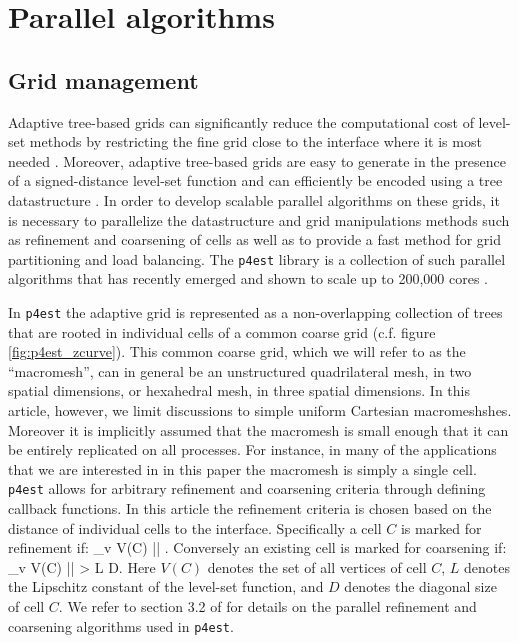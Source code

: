 \section{Parallel algorithms}\label{sec:parallel algorithms}
\subsection{Grid management}
Adaptive tree-based grids can significantly reduce the computational cost of level-set methods by restricting the fine grid close to the interface where it is most needed \cite{Strain:99:Tree-Methods-for-Mov}. Moreover, adaptive tree-based grids are easy to generate in the presence of a signed-distance level-set function \cite{Min;Gibou:07:A-second-order-accur} and can efficiently be encoded using a tree datastructure \cite{Samet:90:Applications-of-Spat}. In order to develop scalable parallel algorithms on these grids, it is necessary to parallelize the datastructure and grid manipulations methods such as refinement and coarsening of cells as well as to provide a fast method for grid partitioning and load balancing. The \texttt{p4est} library \cite{p4est-github} is a collection of such parallel algorithms that has recently emerged and shown to scale up to 200,000 cores \cite{Burstedde;Wilcox;Ghattas:11:p4est:-Scalable-Algo}.

In \texttt{p4est} the adaptive grid is represented as a non-overlapping collection of trees that are rooted in individual cells of a common coarse grid (c.f. figure \ref{fig:p4est_zcurve}). This common coarse grid, which we will refer to as the ``macromesh'', can in general be an unstructured quadrilateral mesh, in two spatial dimensions, or hexahedral mesh, in three spatial dimensions. In this article, however, we limit discussions to simple uniform Cartesian macromeshshes. Moreover it is implicitly assumed that the macromesh is small enough that it can be entirely replicated on all processes. For instance, in many of the applications that we are interested in in this paper the macromesh is simply a single cell. \texttt{p4est} allows for arbitrary refinement and coarsening criteria through defining callback functions. In this article the refinement criteria is chosen based on the distance of individual cells to the interface. Specifically a cell $C$ is marked for refinement if:
\be
\min_{\forall v \in V(C)} |\phi| \le {}.
\label{eq:refine}
\ee
Conversely an existing cell is marked for coarsening if:
\be
\min_{\forall v \in V(C)} |\phi| > L D.
\label{eq:coarsen}
\ee
Here $V(C)$ denotes the set of all vertices of cell $C$, $L$ denotes the Lipschitz constant of the level-set function, and $D$ denotes the diagonal size of cell $C$. We refer to section 3.2 of \cite{Burstedde;Wilcox;Ghattas:11:p4est:-Scalable-Algo} for details on the parallel refinement and coarsening algorithms used in \texttt{p4est}.

